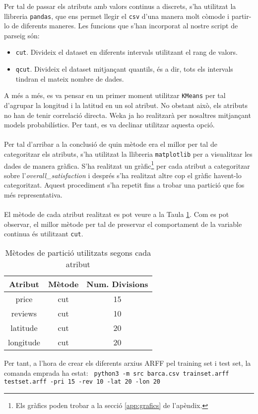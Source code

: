 
\label{sec:partition}

Per tal de passar els atributs amb valors continus a  discrets, s'ha utilitzat la llibreria \texttt{pandas}, que ens permet llegir el \texttt{csv} d'una manera molt còmode i partir-lo de diferents maneres. Les funcions que s'han incorporat al nostre script de parseig són:
\begin{itemize}
	\item \texttt{cut}. Divideix el dataset en diferents intervals utilitzant el rang de valors.
	\item \texttt{qcut}. Divideix el dataset mitjançant quantils, és a dir, tots els intervals tindran el mateix nombre de dades.
\end{itemize}
A més a més, es va pensar en un primer moment utilitzar \texttt{KMeans} per tal d'agrupar la longitud i la latitud en un sol atribut. No obstant això, els atributs no han de tenir correlació directa. Weka ja ho realitzarà per nosaltres mitjançant models probabilístics. Per tant, es va declinar utilitzar aquesta opció.
\\\\
Per tal d'arribar a la conclusió de quin mètode era el millor per tal de categoritzar els atributs, s'ha utilitzat la llibreria \texttt{matplotlib} per a visualitzar les dades de manera gràfica. S'ha realitzat un gràfic\footnote{Els gràfics poden trobar a la secció \ref{app:grafics} de l'apèndix.} per cada atribut a categoritzar sobre l'\textit{overall\_satisfaction} i després s'ha realitzat altre cop el gràfic havent-lo categoritzat. Aquest procediment s'ha repetit fins a trobar una partició que fos més representativa.
\\
\\
El mètode de cada atribut realitzat es pot veure a la Taula \ref{tab:part}. Com es pot observar, el millor mètode per tal de preservar el comportament de la variable continua és utilitzant \texttt{cut}.
\begin{table}[H]
	\centering
\begin{tabular}{ccc}
	Atribut &Mètode & Num. Divisions\\\hline
	price & cut & 15 \\
	reviews & cut & 10 \\
	latitude & cut & 20 \\
	longitude & cut & 20 \\
\end{tabular}
\caption{Mètodes de partició utilitzats segons cada atribut}
\label{tab:part}
\end{table}
Per tant, a l'hora de crear els diferents arxius ARFF pel training set i test set, la comanda emprada ha estat:
\texttt{
python3 -m src barca.csv trainset.arff testset.arff -pri 15 -rev 10 -lat 20 -lon 20
}



